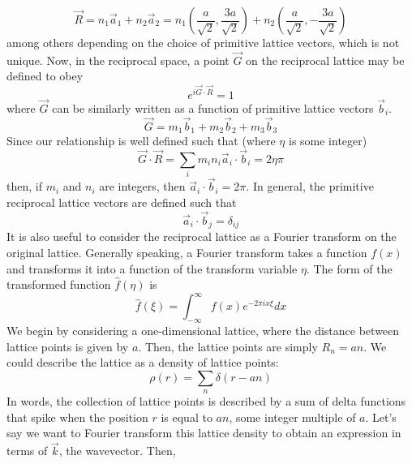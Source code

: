 \documentclass{article}
\begin{document}
\begin{equation}
\vec{R} = n_{1}\vec{a}_{1} + n_{2}\vec{a}_2 = n_{1}(\frac{a}{\sqrt{2}}, \frac{3a}{\sqrt{2}}) + n_{2}(\frac{a}{\sqrt{2}}, -\frac{3a}{\sqrt{2}})
\end{equation}
among others depending on the choice of primitive lattice vectors, which is not unique.
Now, in the reciprocal space, a point $\vec{G}$ on the reciprocal lattice may be defined to obey
\begin{equation}
e^{i\vec{G}\cdot\vec{R}} = 1
\end{equation}
where $\vec{G}$ can be similarly written as a function of primitive lattice vectors $\vec{b}_{i}$.
\begin{equation}
\vec{G} = m_{1}\vec{b}_{1} + m_{2}\vec{b}_{2} + m_{3}\vec{b}_{3}
\end{equation}
Since our relationship is well defined such that (where $\eta$ is some integer)
\begin{equation}
\vec{G}\cdot\vec{R} = \sum_{i}m_{i}n_{i}\vec{a}_{i}\cdot\vec{b}_{i} = 2\eta\pi
\end{equation}
then, if $m_{i}$ and $n_{i}$ are integers, then $\vec{a}_{i}\cdot\vec{b}_{i} = 2\pi$. In general, the primitive
reciprocal lattice vectors are defined such that
\begin{equation}
\vec{a}_{i}\cdot\vec{b}_{j} = \delta_{ij}
\end{equation}
It is also useful to consider the reciprocal lattice as a Fourier transform on the original lattice.
Generally speaking, a Fourier transform takes a function $f(x)$ and transforms it into a function of
the transform variable $\eta$. The form of the transformed function $\hat{f}(\eta)$ is
\begin{equation}
\hat{f}(\xi) = \int_{-\infty}^{\infty} f(x)e^{-2\pi ix\xi}dx
\end{equation}
We begin by considering a one-dimensional lattice, where the distance between lattice points is
given by $a$. Then, the lattice points are simply $R_{n} = an$. We could describe the lattice as a
density of lattice points:
\begin{equation}
\rho(r) = \sum_{n}\delta(r - an)
\end{equation}
In words, the collection of lattice points is described by a sum of delta functions that spike when the
position $r$ is equal to $an$, some integer multiple of $a$. Let's say we want to Fourier transform this
lattice density to obtain an expression in terms of $\vec{k}$, the wavevector. Then,
\end{document}
